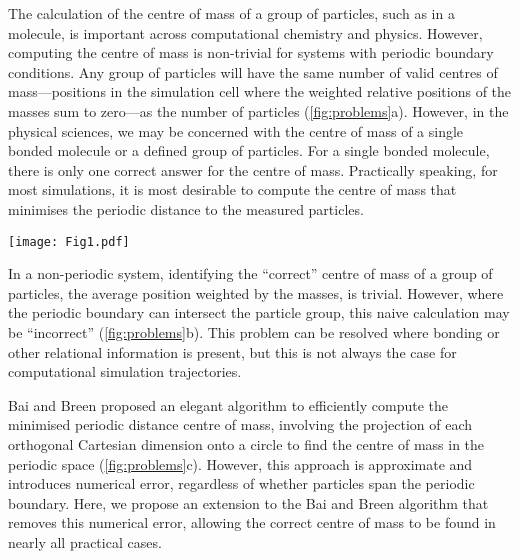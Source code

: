 \documentclass[reprint,superscriptaddress,nobibnotes,amsmath,amssymb,aip]{revtex4-2}
\begin{document}
The calculation of the centre of mass of a group of particles, such as in a molecule, is important across computational chemistry and physics.\cite{zhang_chemically_2024,happel_coordinated_2024,maggi_universality_2021,grillo_molecular_2023,bullerjahn_unwrapping_2023,jaeger-honz_systematic_2024}
However, computing the centre of mass is non-trivial for systems with periodic boundary conditions. 
Any group of particles will have the same number of valid centres of mass---positions in the simulation cell where the weighted relative positions of the masses sum to zero---as the number of particles (\cref{fig:problems}a). 
However, in the physical sciences, we may be concerned with the centre of mass of a single bonded molecule or a defined group of particles. 
For a single bonded molecule, there is only one correct answer for the centre of mass.
Practically speaking, for most simulations, it is most desirable to compute the centre of mass that minimises the periodic distance to the measured particles.
%
\begin{figure*}
  \texttt{[image: Fig1.pdf]}
  \caption{
  (a) Demonstration of the $N$ possible centres of mass in an $N$ particle system, where two periodic cells are visible, and the dashed line indicates the particle grouping that leads to a given centre of mass (cross). 
  (b) The problem with the naive centre of mass (red cross) calculation in periodic systems, where the particle group spans a periodic boundary. 
  (c) The projection of the particles in the bottom diagram of (b) onto a circle to find the centre of mass, which minimises the weighted distance to all particles.}
  \label{fig:problems}
\end{figure*}
%

In a non-periodic system, identifying the ``correct'' centre of mass of a group of particles, the average position weighted by the masses, is trivial. 
However, where the periodic boundary can intersect the particle group, this naive calculation may be ``incorrect'' (\cref{fig:problems}b). 
This problem can be resolved where bonding or other relational information is present, but this is not always the case for computational simulation trajectories. 

Bai and Breen proposed an elegant algorithm to efficiently compute the minimised periodic distance centre of mass,\cite{bai_calculating_2008} involving the projection of each orthogonal Cartesian dimension onto a circle to find the centre of mass in the periodic space (\cref{fig:problems}c). 
However, this approach is approximate and introduces numerical error, regardless of whether particles span the periodic boundary. 
Here, we propose an extension to the Bai and Breen algorithm that removes this numerical error, allowing the correct centre of mass to be found in nearly all practical cases. 
\end{document}
